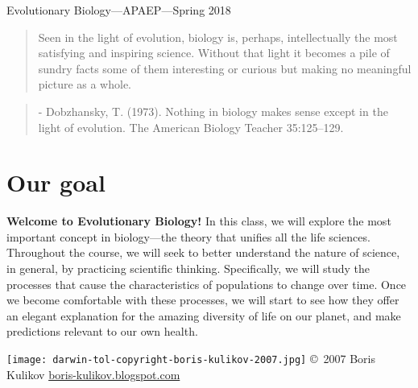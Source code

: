 



\setlength{\parindent}{0.25in}

\begin{mytitle}
    Evolutionary Biology---APAEP---Spring 2018
\end{mytitle}


\begin{quote}
    \large\sffamily
    Seen in the light of evolution, biology is, perhaps, intellectually the
    most satisfying and inspiring science. Without that light it becomes a pile
    of sundry facts some of them interesting or curious but making no
    meaningful picture as a whole.
\end{quote}

\begin{quote}
    \small\sffamily
    - Dobzhansky, T. (1973). Nothing in biology makes sense except in the light
    of evolution. The American Biology Teacher 35:125--129.
\end{quote}

\noindent
\begin{minipage}{.52\textwidth}
    \section{Our goal}
    
    \noindent\textbf{Welcome to Evolutionary Biology!}
    In this class, we will explore the most important concept in biology---the
    theory that unifies all the life sciences.
    Throughout the course, we will seek to better understand the nature of
    science, in general, by practicing scientific thinking.
    Specifically, we will study the processes that cause the characteristics of
    populations to change over time.
    Once we become comfortable with these processes, we will start to see how
    they offer an elegant explanation for the amazing diversity of life on our
    planet,
    and make predictions relevant to our own health.
\end{minipage}%
\begin{minipage}{.47\textwidth}
    \centering
    \texttt{[image: darwin-tol-copyright-boris-kulikov-2007.jpg]}
    {\tiny \copyright~2007 Boris Kulikov \href{http://boris-kulikov.blogspot.com/}{boris-kulikov.blogspot.com}}
\end{minipage}


